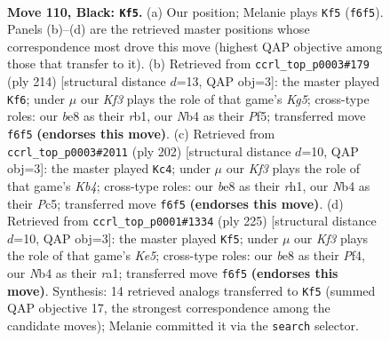 \documentclass[11pt]{article}
\begin{document}
\clearpage

\begin{figure}[p]\centering
\begin{subfigure}{0.46\textwidth}\centering
\resizebox{\linewidth}{!}{%
\newchessgame
\chessboard[
  setfen={4B3/8/5k2/4r1p1/1n6/6K1/8/8 b - - 5 110},
  showmover=false,
  pgfstyle=straightmove, color=movearrow, markmove={f6-f5}
]}
\caption{}
\end{subfigure}\hfill
\begin{subfigure}{0.46\textwidth}\centering
\resizebox{\linewidth}{!}{%
\newchessgame
\chessboard[
  setfen={8/7k/7P/5PK1/7R/8/8/1r6 w - - 43 108},
  showmover=false,
  pgfstyle=straightmove, color=movearrow, markmove={g5-f6}
]}
\caption{}
\end{subfigure}
\\[4pt]
\begin{subfigure}{0.46\textwidth}\centering
\resizebox{\linewidth}{!}{%
\newchessgame
\chessboard[
  setfen={8/k7/P7/2P5/1K6/R7/8/7r w - - 27 102},
  showmover=false,
  pgfstyle=straightmove, color=movearrow, markmove={b4-c4}
]}
\caption{}
\end{subfigure}\hfill
\begin{subfigure}{0.46\textwidth}\centering
\resizebox{\linewidth}{!}{%
\newchessgame
\chessboard[
  setfen={8/8/8/8/4kp2/3r3p/7K/R7 b - - 35 113},
  showmover=false,
  pgfstyle=straightmove, color=movearrow, markmove={e4-f5}
]}
\caption{}
\end{subfigure}
\caption{\textbf{Move 110, Black: \texttt{Kf5}.} (a) Our position; Melanie plays \texttt{Kf5} (\texttt{f6f5}). Panels (b)--(d) are the retrieved master positions whose correspondence most drove this move (highest QAP objective among those that transfer to it). (b) Retrieved from \texttt{ccrl\_top\_p0003\#179} (ply 214) [structural distance $d$=13, QAP obj=3]: the master played \texttt{Kf6}; under $\mu$ our \emph{Kf3} plays the role of that game's \emph{Kg5}; cross-type roles: our \emph{b}e8 as their \emph{r}b1, our \emph{N}b4 as their \emph{P}f5; transferred move \texttt{f6f5} \textbf{(endorses this move)}. (c) Retrieved from \texttt{ccrl\_top\_p0003\#2011} (ply 202) [structural distance $d$=10, QAP obj=3]: the master played \texttt{Kc4}; under $\mu$ our \emph{Kf3} plays the role of that game's \emph{Kb4}; cross-type roles: our \emph{b}e8 as their \emph{r}h1, our \emph{N}b4 as their \emph{P}c5; transferred move \texttt{f6f5} \textbf{(endorses this move)}. (d) Retrieved from \texttt{ccrl\_top\_p0001\#1334} (ply 225) [structural distance $d$=10, QAP obj=3]: the master played \texttt{Kf5}; under $\mu$ our \emph{Kf3} plays the role of that game's \emph{Ke5}; cross-type roles: our \emph{b}e8 as their \emph{P}f4, our \emph{N}b4 as their \emph{r}a1; transferred move \texttt{f6f5} \textbf{(endorses this move)}. Synthesis: 14 retrieved analogs transferred to \texttt{Kf5} (summed QAP objective 17, the strongest correspondence among the candidate moves); Melanie committed it via the \texttt{search} selector.}
\label{fig:thought-m219}
\end{figure}
\end{document}

